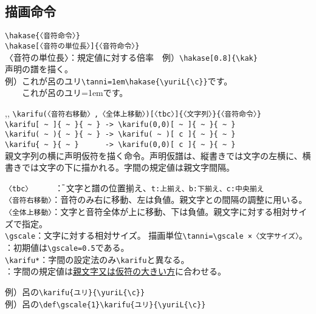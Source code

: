 \documentclass[a4paper,luatex]{l3doc}
\begin{document}
\subsection{描画命令}
\begin{function}{\hakase}
 \verb|\hakase{〈音符命令〉}|\\
 \verb|\hakase[〈音符の単位長〉]{〈音符命令〉}|\\
〈音符の単位長〉：規定値に対する倍率　例）\verb|\hakase[0.8]{\kak}|\\
 声明の譜を描く。\\
例）これが呂のユリ\verb|\tanni=1em\hakase{\yuriL{\c}}|です。\\
　　これが呂のユリ\tanni=1em\hakase{\yuriL{\c}}です。
\end{function}
\begin{function}{\karifu,\karifu*,\gscale}
 \verb|\karifu(〈音符右移動〉,〈全体上移動〉)[〈tbc〉]{〈文字列〉}{〈音符命令〉}|\\
 \verb|\karifu[ ~ ]{ ~ }{ ~ } -> \karifu(0,0)[ ~ ]{ ~ }{ ~ }|\\
 \verb|\karifu( ~ ){ ~ }{ ~ } -> \karifu( ~ )[ c ]{ ~ }{ ~ }|\\
 \verb|\karifu{ ~ }{ ~ }      -> \karifu(0,0)[ c ]{ ~ }{ ~ }|\\
\newline
親文字列の横に声明仮符を描く命令。声明仮譜は、縦書きでは文字の左横に、横書きでは文字の下に描かれる。字間の規定値は親文字間隔。
\begin{tabbing}
 \verb|〈tbc〉　　　 |\=： 文字と譜の位置揃え、\verb|t:上揃え、b:下揃え、c:中央揃え|\\
 \verb|〈音符右移動〉|\>：音符のみ右に移動、左は負値。親文字との間隔の調整に用いる。\\
 \verb|〈全体上移動〉|\>：文字と音符全体が上に移動、下は負値。親文字に対する相対サイズで指定。\\
 \verb|\gscale|\>：文字に対する相対サイズ。
 描画単位\verb|\tanni=\gscale ×〈文字サイズ〉|。\\
 \>：初期値は\verb|\gscale=0.5|である。\\
\verb|\karifu*|\>：字間の設定法のみ\verb|\karifu|と異なる。\\
\>：字間の規定値は\underline{親文字又は仮符の大きい方}に合わせる。
\end{tabbing}
例）呂の\verb|\karifu{ユリ}{\yuriL{\c}}|
\hspace{2em}\\
例）呂の\verb|\def\gscale{1}\karifu{ユリ}{\yuriL{\c}}|
\hspace{2em}
\end{function}
\end{document}
